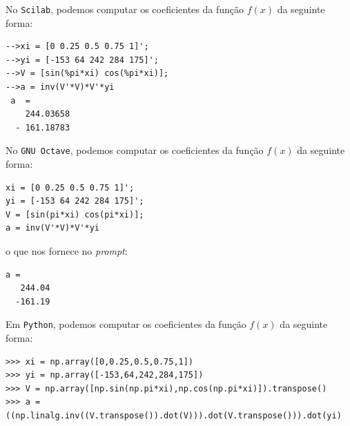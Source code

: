 \begin{sol}
\ifisscilab
No \verb+Scilab+, podemos computar os coeficientes da função $f(x)$ da seguinte forma:
\begin{verbatim}
-->xi = [0 0.25 0.5 0.75 1]';
-->yi = [-153 64 242 284 175]';
-->V = [sin(%pi*xi) cos(%pi*xi)];
-->a = inv(V'*V)*V'*yi
 a  =
    244.03658
  - 161.18783
\end{verbatim}
\fi
\ifisoctave
No \verb+GNU Octave+, podemos computar os coeficientes da função $f(x)$ da seguinte forma:
\begin{verbatim}
xi = [0 0.25 0.5 0.75 1]';
yi = [-153 64 242 284 175]';
V = [sin(pi*xi) cos(pi*xi)];
a = inv(V'*V)*V'*yi
\end{verbatim}
o que nos fornece no {\it prompt}:
\begin{verbatim}
a =
   244.04
  -161.19
\end{verbatim}
\fi
\ifispython
Em \verb+Python+, podemos computar os coeficientes da função $f(x)$ da seguinte forma:
\begin{verbatim}
>>> xi = np.array([0,0.25,0.5,0.75,1])
>>> yi = np.array([-153,64,242,284,175])
>>> V = np.array([np.sin(np.pi*xi),np.cos(np.pi*xi)]).transpose()
>>> a = ((np.linalg.inv((V.transpose()).dot(V))).dot(V.transpose())).dot(yi)
\end{verbatim}
\fi

\end{sol}

